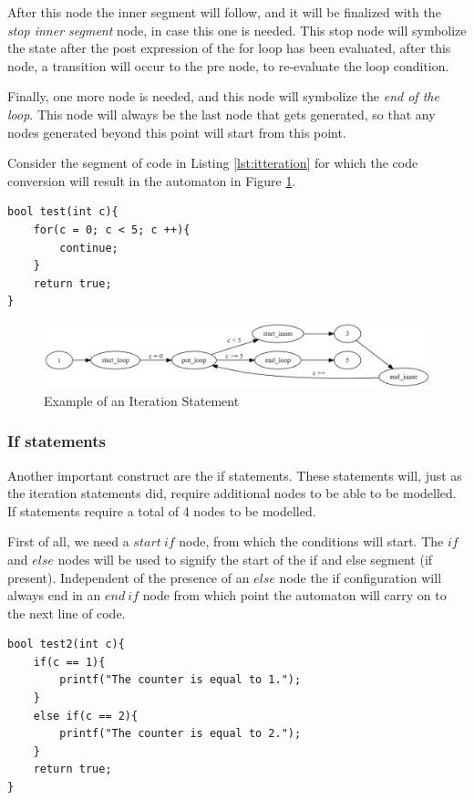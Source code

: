 \documentclass[12pt]{article}
\begin{document}
After this node the inner segment will follow, and it will be finalized with the \textit{stop inner segment} node, in case this one is needed. This stop node will symbolize the state after the post expression of the for loop has been evaluated, after this node, a transition will occur to the pre node, to re-evaluate the loop condition.

Finally, one more node is needed, and this node will symbolize the \textit{end of the loop}. This node will always be the last node that gets generated, so that any nodes generated beyond this point will start from this point.

Consider the segment of code in Listing \ref{lst:itteration} for which the code conversion will result in the automaton in Figure \ref{fig:test_counter_automaton}.
\begin{lstlisting}[style=CStyle, caption={Example of an itteration statement}, label={lst:itteration}]
bool test(int c){
	for(c = 0; c < 5; c ++){
		continue;
	}
	return true;
}
\end{lstlisting}

\begin{figure}[h]
	\centering
	\includegraphics[width=0.95\linewidth]{test_counter_automaton}
	\caption{Example of an Iteration Statement}
	\label{fig:test_counter_automaton}
\end{figure}

\subsubsection{If statements}
\label{sec:if}
Another important construct are the if statements. These statements will, just as the iteration statements did, require additional nodes to be able to be modelled. If statements require a total of 4 nodes to be modelled.

First of all, we need a $start\ if$ node, from which the conditions will start. The $if$ and $else$ nodes will be used to signify the start of the if and else segment (if present). Independent of the presence of an $else$ node the if configuration will always end in an $end\ if$ node from which point the automaton will carry on to the next line of code.

\begin{lstlisting}[style=CStyle, caption={Example if statements}, label={lst:if}]
bool test2(int c){
	if(c == 1){
		printf("The counter is equal to 1.");
	}
	else if(c == 2){
		printf("The counter is equal to 2.");
	}
	return true;
}
\end{lstlisting}
\end{document}
